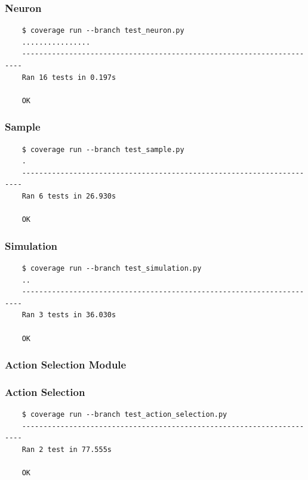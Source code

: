 \documentclass[a4paper,11pt]{article}
\begin{document}
\subsubsection*{{\hspace{6mm}}Neuron}
\begin{verbatim}
    $ coverage run --branch test_neuron.py
    ................
    ----------------------------------------------------------------------
    Ran 16 tests in 0.197s

    OK
\end{verbatim}

\subsubsection*{{\hspace{6mm}}Sample}
\begin{verbatim}
    $ coverage run --branch test_sample.py
    .
    ----------------------------------------------------------------------
    Ran 6 tests in 26.930s

    OK
\end{verbatim}

\subsubsection*{{\hspace{6mm}}Simulation}
\begin{verbatim}
    $ coverage run --branch test_simulation.py
    ..
    ----------------------------------------------------------------------
    Ran 3 tests in 36.030s

    OK
\end{verbatim}

\subsubsection{Action Selection Module}
\subsubsection*{{\hspace{6mm}}Action Selection}
\begin{verbatim}
    $ coverage run --branch test_action_selection.py
    ----------------------------------------------------------------------
    Ran 2 test in 77.555s

    OK
\end{verbatim}
\end{document}
